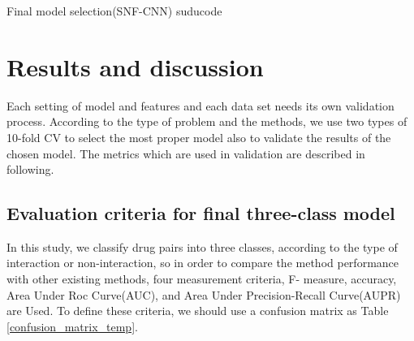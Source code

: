 \documentclass{bmcart}
\begin{document}
\renewcommand{\algorithmicrequire}{\textbf{Input:}}
\renewcommand{\algorithmicensure}{\textbf{Output:}}
\begin{algorithm}[!h]
\caption{Final model selection(SNF-CNN) suducode}
\label{SNFCNNSuducode}
\end{algorithm}


\section*{Results and discussion}

Each setting of model and features and each data set needs its own validation process. According to the type of problem and the methods, we use two types of 10-fold CV to select the most proper model also to validate the results of the chosen model. The metrics which are used in validation are described in following.

\subsection*{Evaluation criteria for final three-class model}
In this study, we classify drug pairs into three classes, according to the type of interaction or non-interaction, so in order to compare the method performance with other existing methods, four measurement criteria, F- measure, accuracy, Area Under Roc Curve(AUC), and Area Under Precision-Recall Curve(AUPR) are Used. To define these criteria, we should use a confusion matrix as Table \ref{confusion_matrix_temp}.
\end{document}
